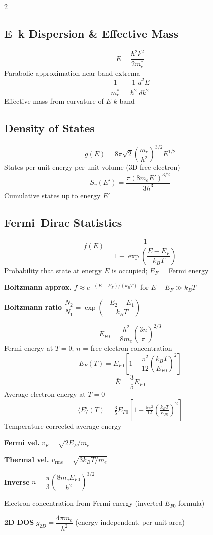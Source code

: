 \documentclass[9pt]{extarticle}
\newcommand{\eqlabel}[1]{\textbf{\scriptsize #1}\;}
\newcommand{\desc}[1]{{\small\color{desc}#1}}
\begin{document}
\begin{multicols}{2}
\subsection{E--k Dispersion \& Effective Mass}
\[E = \frac{\hbar^2 k^2}{2m_e^*}\]
\desc{Parabolic approximation near band extrema}
\[\frac{1}{m_e^*} = \frac{1}{\hbar^2}\frac{d^2E}{dk^2}\]
\desc{Effective mass from curvature of $E$-$k$ band}

\subsection{Density of States}
\[g(E) = 8\pi\sqrt{2}\left(\frac{m_e}{h^2}\right)^{3/2}E^{1/2}\]
\desc{States per unit energy per unit volume (3D free electron)}
\[S_v(E') = \frac{\pi(8m_eE')^{3/2}}{3h^3}\]
\desc{Cumulative states up to energy $E'$}

\subsection{Fermi--Dirac Statistics}
\[f(E) = \frac{1}{1+\exp\!\left(\dfrac{E-E_F}{k_BT}\right)}\]
\desc{Probability that state at energy $E$ is occupied; $E_F$ = Fermi energy}

\eqlabel{Boltzmann approx.} $f \approx e^{-(E-E_F)/(k_BT)}$ for $E-E_F \gg k_BT$

\eqlabel{Boltzmann ratio} $\dfrac{N_2}{N_1} = \exp\!\left(-\dfrac{E_2-E_1}{k_BT}\right)$

\[E_{F0} = \frac{h^2}{8m_e}\left(\frac{3n}{\pi}\right)^{2/3}\]
\desc{Fermi energy at $T=0$; $n$ = free electron concentration}
\[E_F(T) = E_{F0}\!\left[1 - \frac{\pi^2}{12}\!\left(\frac{k_BT}{E_{F0}}\right)^{\!2}\right]\]
\[\bar{E} = \frac{3}{5}E_{F0}\]
\desc{Average electron energy at $T = 0$}
\[\langle E \rangle(T) = \tfrac{3}{5}E_{F0}\!\left[1 + \tfrac{5\pi^2}{12}\!\left(\tfrac{k_BT}{E_{F0}}\right)^{\!2}\right]\]
\desc{Temperature-corrected average energy}

\eqlabel{Fermi vel.} $v_F = \sqrt{2E_F/m_e}$

\eqlabel{Thermal vel.} $v_{\text{rms}} = \sqrt{3k_BT/m_e}$

\eqlabel{Inverse} $n = \dfrac{\pi}{3}\!\left(\dfrac{8m_eE_{F0}}{h^2}\right)^{3/2}$

\desc{Electron concentration from Fermi energy (inverted $E_{F0}$ formula)}

\eqlabel{2D DOS} $g_{2D} = \dfrac{4\pi m_e}{h^2}$ \desc{(energy-independent, per unit area)}



\end{multicols}
\end{document}
